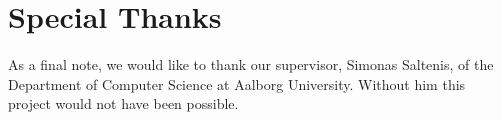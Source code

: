 \section*{Special Thanks}
As a final note, we would like to thank our supervisor, Simonas Saltenis, of the Department of Computer Science at Aalborg University. Without him this project would not have been possible. 
